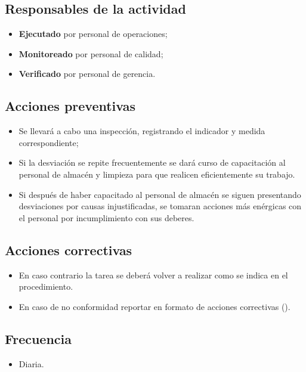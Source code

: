 \subsection{Responsables de la actividad}

\begin{itemize}
	\item \textbf{Ejecutado} por personal de operaciones;
	\item \textbf{Monitoreado} por personal de calidad;
	\item \textbf{Verificado} por personal de gerencia.
\end{itemize}

\subsection{Acciones preventivas}
\begin{itemize}
	\item Se llevará a cabo una inspección, registrando el indicador y medida correspondiente;
	\item Si la desviación se repite frecuentemente se dará curso de capacitación al personal de almacén y limpieza para que realicen eficientemente su trabajo.
	\item Si después de haber capacitado al personal de almacén se siguen presentando desviaciones por causas injustificadas, se tomaran acciones más enérgicas con el personal por incumplimiento con sus deberes.
\end{itemize}

\subsection{Acciones correctivas}

\begin{itemize}
	\item En caso contrario la tarea se deberá volver a realizar como se indica en el procedimiento.
	\item En caso de no conformidad reportar en formato de acciones correctivas (\IdFormAACC).
\end{itemize}

\subsection{Frecuencia}

\begin{itemize}
	\item Diaria.
\end{itemize}

